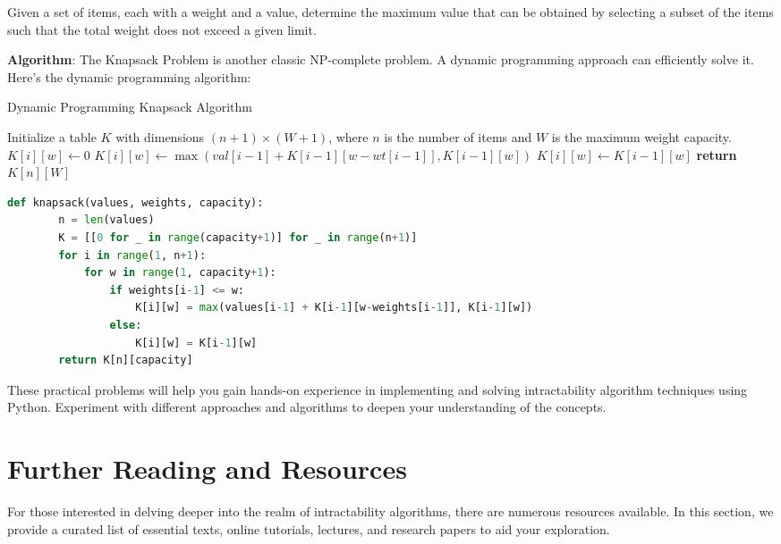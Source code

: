 \begin{enumerate}
    Given a set of items, each with a weight and a value, determine the maximum value that can be obtained by selecting a subset of the items such that the total weight does not exceed a given limit.
    
    \textbf{Algorithm}:
    The Knapsack Problem is another classic NP-complete problem. A dynamic programming approach can efficiently solve it. Here's the dynamic programming algorithm:
    
    \begin{algorithm}[H]
        \caption{Dynamic Programming Knapsack Algorithm}
        \begin{algorithmic}[1]
            \State Initialize a table $K$ with dimensions $(n+1) \times (W+1)$, where $n$ is the number of items and $W$ is the maximum weight capacity.
                        \State $K[i][w] \gets 0$
                        \State $K[i][w] \gets \max(val[i-1] + K[i-1][w-wt[i-1]], K[i-1][w])$
                    \Else
                        \State $K[i][w] \gets K[i-1][w]$
                    \EndIf
                \EndFor
            \EndFor
            \State \textbf{return} $K[n][W]$
        \end{algorithmic}
    \end{algorithm}
    
    \FloatBarrier
    
    \begin{lstlisting}[language=Python]
    def knapsack(values, weights, capacity):
        n = len(values)
        K = [[0 for _ in range(capacity+1)] for _ in range(n+1)]
        for i in range(1, n+1):
            for w in range(1, capacity+1):
                if weights[i-1] <= w:
                    K[i][w] = max(values[i-1] + K[i-1][w-weights[i-1]], K[i-1][w])
                else:
                    K[i][w] = K[i-1][w]
        return K[n][capacity]
    \end{lstlisting}
    
\end{enumerate}

These practical problems will help you gain hands-on experience in implementing and solving intractability algorithm techniques using Python. Experiment with different approaches and algorithms to deepen your understanding of the concepts.

\section{Further Reading and Resources}
For those interested in delving deeper into the realm of intractability algorithms, there are numerous resources available. In this section, we provide a curated list of essential texts, online tutorials, lectures, and research papers to aid your exploration.

